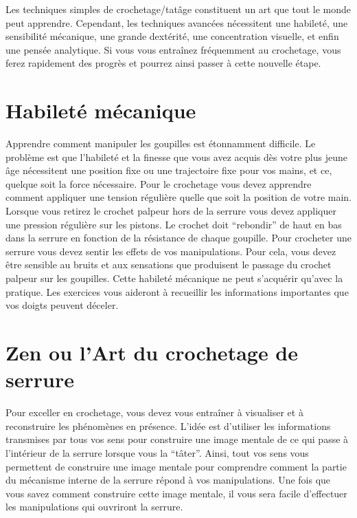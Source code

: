 \documentclass[a4paper,french,11pt,twoside]{report}
\begin{document}
Les techniques simples de crochetage/tatâge constituent un art que tout le monde peut apprendre. Cependant, les techniques avancées nécessitent une habileté, une sensibilité mécanique, une grande dextérité, une concentration visuelle, et enfin une pensée analytique. Si vous vous entraînez fréquemment au crochetage, vous ferez rapidement des progrès et pourrez ainsi passer à cette nouvelle étape.

\section{Habileté mécanique}

Apprendre comment manipuler les goupilles est étonnamment difficile. Le problème est que l'habileté et la finesse que vous avez acquis dès votre plus jeune âge nécessitent une position fixe ou une trajectoire fixe pour vos mains, et ce, quelque soit la force nécessaire. Pour le crochetage vous devez apprendre comment appliquer une tension régulière quelle que soit la position de votre main. Lorsque vous retirez le crochet palpeur hors de la serrure vous devez appliquer une pression régulière sur les pistons. Le crochet doit \enquote{rebondir} de haut en bas dans la serrure en fonction de la résistance de chaque goupille.
Pour crocheter une serrure vous devez sentir les effets de vos manipulations. Pour cela, vous devez être sensible au bruits et aux sensations que produisent le passage du crochet palpeur sur les goupilles. Cette habileté mécanique ne peut s'acquérir qu'avec la pratique. Les exercices vous aideront à recueillir les informations importantes que vos doigts peuvent déceler.

\section{Zen ou l'Art du crochetage de serrure}

Pour exceller en crochetage, vous devez vous entraîner à visualiser et à reconstruire les phénomènes en présence. L'idée est d'utiliser les informations transmises par tous vos sens pour construire une image mentale de ce qui passe à l'intérieur de la serrure lorsque vous la \enquote{tâter}. Ainsi, tout vos sens vous permettent de construire une image mentale pour comprendre comment la partie du mécanisme interne de la serrure répond à vos manipulations. Une fois que vous savez comment construire cette image mentale, il vous sera facile d'effectuer les manipulations qui ouvriront la serrure.
\end{document}
